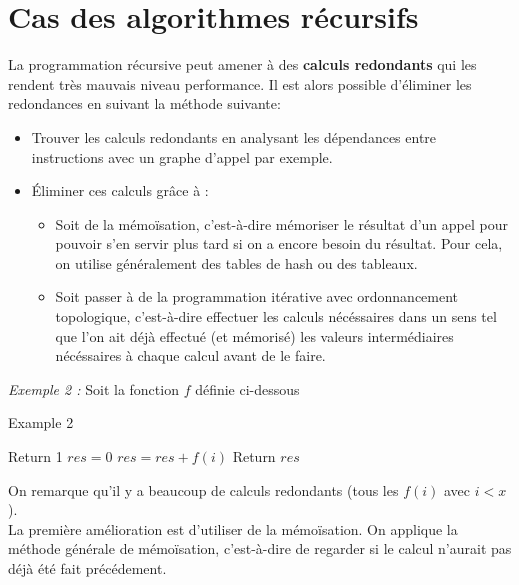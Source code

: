 \documentclass[
  paper=a4,
  ,captions=tableheading
]{scrartcl}
\providecommand{\tightlist}{%
  \setlength{\itemsep}{0pt}\setlength{\parskip}{0pt}}
\begin{document}
\hypertarget{cas-des-algorithmes-ruxe9cursifs}{%
\section{Cas des algorithmes
récursifs}\label{cas-des-algorithmes-ruxe9cursifs}}

La programmation récursive peut amener à des \textbf{calculs redondants}
qui les rendent très mauvais niveau performance. Il est alors possible
d'éliminer les redondances en suivant la méthode suivante:

\begin{itemize}
\tightlist
\item
  Trouver les calculs redondants en analysant les dépendances entre
  instructions avec un graphe d'appel par exemple.\\
\item
  Éliminer ces calculs grâce à :

  \begin{itemize}
  \tightlist
  \item
    Soit de la mémoïsation, c'est-à-dire mémoriser le résultat d'un
    appel pour pouvoir s'en servir plus tard si on a encore besoin du
    résultat. Pour cela, on utilise généralement des tables de hash ou
    des tableaux.
  \item
    Soit passer à de la programmation itérative avec ordonnancement
    topologique, c'est-à-dire effectuer les calculs nécéssaires dans un
    sens tel que l'on ait déjà effectué (et mémorisé) les valeurs
    intermédiaires nécéssaires à chaque calcul avant de le faire.
  \end{itemize}
\end{itemize}

\emph{Exemple 2 :} Soit la fonction \(f\) définie ci-dessous

\begin{algorithm}[H]
\caption{Example 2}
\begin{algorithmic}[4]
      \State Return 1
    \EndIf
    \State $res = 0$
      \State $res = res + f(i)$
    \EndFor
  \State Return $res$
\EndFunction
\end{algorithmic}
\end{algorithm}

On remarque qu'il y a beaucoup de calculs redondants (tous les \(f(i)\)
avec \(i<x\)).\\
La première amélioration est d'utiliser de la mémoïsation. On applique
la méthode générale de mémoïsation, c'est-à-dire de regarder si le
calcul n'aurait pas déjà été fait précédement.
\end{document}
